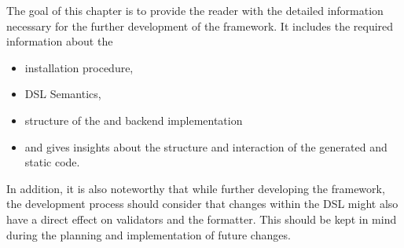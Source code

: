 

The goal of this chapter is to provide the reader with the detailed information necessary for the further development of the \MD framework. It includes the required information about the 

\begin{itemize}
	\item installation procedure,
	\item DSL Semantics,
	\item structure of the \mapapps and backend implementation
	\item and  gives insights about the structure and interaction of the generated and static code.
\end{itemize}

In addition, it is also noteworthy that while further developing the framework, the development process should consider that changes within the DSL might also have a direct effect on validators and the formatter. This should be kept in mind during the planning and implementation of future changes.